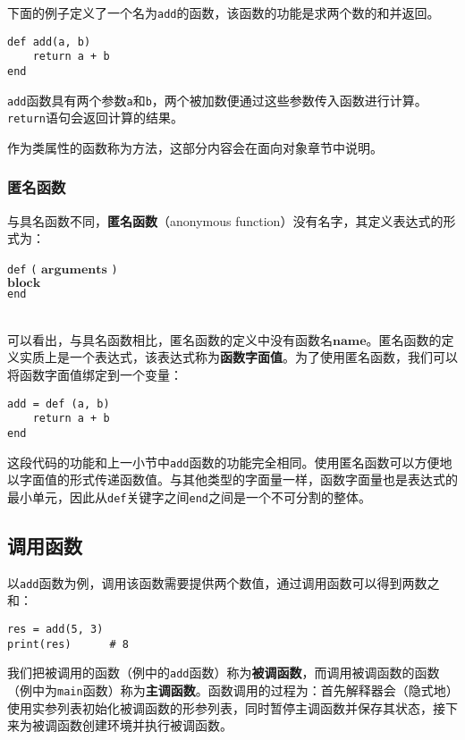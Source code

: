 下面的例子定义了一个名为\texttt{add}的函数，该函数的功能是求两个数的和并返回。
\begin{lstlisting}[language=berry, numbers=none]
def add(a, b)
    return a + b
end
\end{lstlisting}
\texttt{add}函数具有两个参数\texttt{a}和\texttt{b}，两个被加数便通过这些参数传入函数进行计算。\texttt{return}语句会返回计算的结果。

作为类属性的函数称为方法，这部分内容会在面向对象章节中说明。

\subsubsection{匿名函数}

与具名函数不同，\textbf{匿名函数}（anonymous function）没有名字，其定义表达式的形式为：
\begin{algorithm}
    \texttt{def} \texttt{(} $\bm{arguments}$ \texttt{)} \\
        \qquad $\bm{block}$ \\
    \texttt{end}
\end{algorithm}\vspace{-0.6em}\\
可以看出，与具名函数相比，匿名函数的定义中没有函数名$\bm{name}$。匿名函数的定义实质上是一个表达式，该表达式称为\textbf{函数字面值}。为了使用匿名函数，我们可以将函数字面值绑定到一个变量：
\begin{lstlisting}[language=berry, numbers=none]
add = def (a, b)
    return a + b
end
\end{lstlisting}
这段代码的功能和上一小节中\texttt{add}函数的功能完全相同。使用匿名函数可以方便地以字面值的形式传递函数值。与其他类型的字面量一样，函数字面量也是表达式的最小单元，因此从\texttt{def}关键字之间\texttt{end}之间是一个不可分割的整体。

\subsection{调用函数}

以\texttt{add}函数为例，调用该函数需要提供两个数值，通过调用函数可以得到两数之和：
\begin{lstlisting}[language=berry, numbers=none]
res = add(5, 3)
print(res)      # 8
\end{lstlisting}
我们把被调用的函数（例中的\texttt{add}函数）称为\textbf{被调函数}，而调用被调函数的函数（例中为\texttt{main}函数）称为\textbf{主调函数}。函数调用的过程为：首先解释器会（隐式地）使用实参列表初始化被调函数的形参列表，同时暂停主调函数并保存其状态，接下来为被调函数创建环境并执行被调函数。

